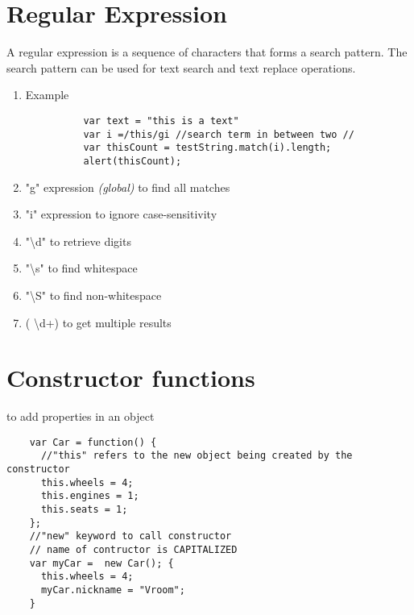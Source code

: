 \documentclass{article}
\begin{document}
  \section{Regular Expression}
  A regular expression is a sequence of characters that forms a search pattern. The search pattern can be used for text search and text replace operations.
    \begin{enumerate}
      \item Example
        \begin{lstlisting}
          var text = "this is a text"
          var i =/this/gi //search term in between two //
          var thisCount = testString.match(i).length;
          alert(thisCount);
        \end{lstlisting}
      \item "g" expression \emph{(global)}
      to find all matches
      \item "i" expression
      to ignore case-sensitivity
      \item  "\textbackslash d"
      to retrieve digits
      \item "\textbackslash s"
      to find whitespace
      \item  "\textbackslash S"
      to find non-whitespace
      \item {( \textbackslash d+)}
      to get multiple results
    \end{enumerate}
  \section{Constructor functions}
  to add properties in an object
  \begin{lstlisting}
    var Car = function() {
      //"this" refers to the new object being created by the constructor
      this.wheels = 4;
      this.engines = 1;
      this.seats = 1;
    };
    //"new" keyword to call constructor
    // name of contructor is CAPITALIZED
    var myCar =  new Car(); {
      this.wheels = 4;
      myCar.nickname = "Vroom";
    }
  \end{lstlisting}
\end{document}
